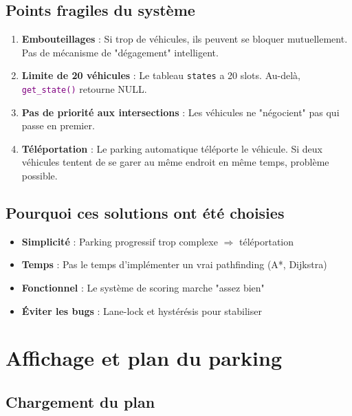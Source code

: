 \documentclass[11pt,a4paper]{article}
\newcommand{\fonction}[1]{\texttt{\textcolor{purple}{#1()}}}
\newcommand{\variable}[1]{\texttt{\textcolor{success}{#1}}}
\begin{document}
\subsection{Points fragiles du système}

\begin{enumerate}
    \item \textbf{Embouteillages} : Si trop de véhicules, ils peuvent se bloquer mutuellement. Pas de mécanisme de "dégagement" intelligent.

    \item \textbf{Limite de 20 véhicules} : Le tableau \variable{states} a 20 slots. Au-delà, \fonction{get\_state} retourne NULL.

    \item \textbf{Pas de priorité aux intersections} : Les véhicules ne "négocient" pas qui passe en premier.

    \item \textbf{Téléportation} : Le parking automatique téléporte le véhicule. Si deux véhicules tentent de se garer au même endroit en même temps, problème possible.
\end{enumerate}

\subsection{Pourquoi ces solutions ont été choisies}

\begin{itemize}
    \item \textbf{Simplicité} : Parking progressif trop complexe $\Rightarrow$ téléportation
    \item \textbf{Temps} : Pas le temps d'implémenter un vrai pathfinding (A*, Dijkstra)
    \item \textbf{Fonctionnel} : Le système de scoring marche "assez bien"
    \item \textbf{Éviter les bugs} : Lane-lock et hystérésis pour stabiliser
\end{itemize}

\section{Affichage et plan du parking}

\subsection{Chargement du plan}
\end{document}
